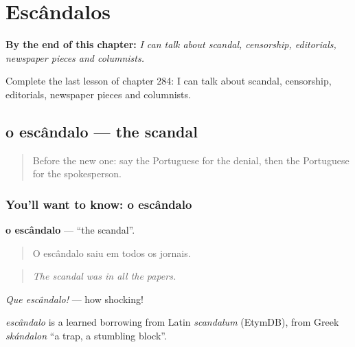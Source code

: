 
\chapter{Escândalos}
\label{ch:pt-escandalos}

\begin{chapteropening}
\textbf{By the end of this chapter:} \emph{I can talk about scandal, censorship, editorials, newspaper pieces and columnists.}

Complete the last lesson of chapter 284: I can talk about scandal, censorship, editorials, newspaper pieces and columnists.
\end{chapteropening}

\section[o escândalo]{o escândalo — the scandal}

\label{lesson:PT-C284-escandalo}



\begin{quote}
Before the new one: say the Portuguese for the denial, then the Portuguese for the spokesperson.
\end{quote}

\subsection*{You'll want to know: o escândalo}
\textbf{o escândalo} — \textquotedblleft{}the scandal\textquotedblright{}.

\begin{quote}
O escândalo saiu em todos os jornais.
\end{quote}

\begin{quote}
\emph{The scandal was in all the papers.}
\end{quote}

\emph{Que escândalo!} — how shocking!

\begin{cousinweb}
\emph{escândalo} is a learned borrowing from Latin \emph{scandalum} (EtymDB), from Greek \emph{skándalon} \textquotedblleft{}a trap, a stumbling block\textquotedblright{}.
\end{cousinweb}

